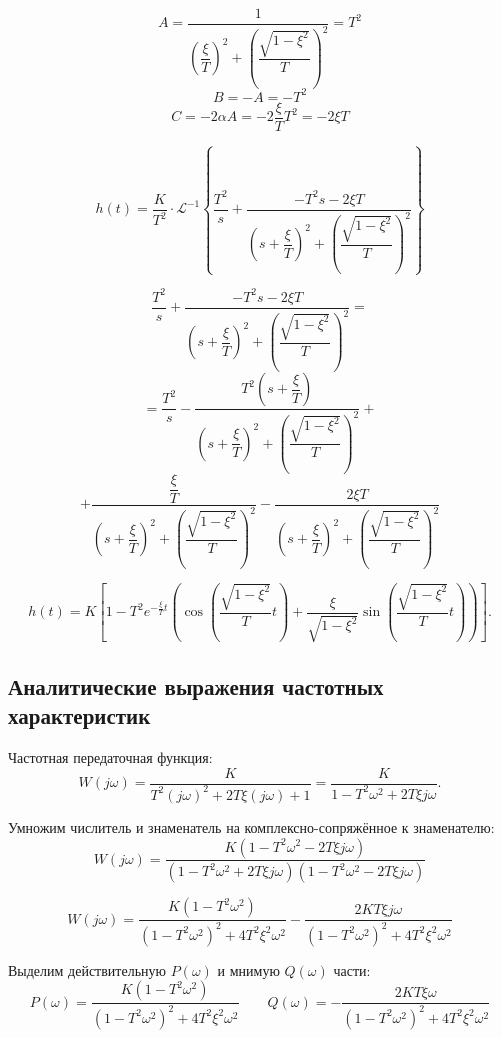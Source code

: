 \documentclass[a5paper, 10pt]{article}
\theoremstyle{definition}
\theoremstyle{plain}
\theoremstyle{remark}
\begin{document}
\[
A = \frac{1}{\left(\dfrac{\xi}{T}\right)^2 + \left(\dfrac{\sqrt{1-\xi^2}}{T}\right)^2}  = T^2
\]
\[
B = -A = -T^2
\]
\[
C = -2\alpha A = -2\dfrac{\xi}{T} T^2 = -2\xi T
\]

\[
h(t)= \frac{K}{T^2} \cdot\mathcal{L}^{-1}\!\left\{ \dfrac{T^2}{s}+\frac{-T^2s-2\xi T}{\left(s + \dfrac{ \xi }{T}\right)^2 + \left(\dfrac{\sqrt{1-\xi^2}}{T}\right)^2}\right\}
\]

$$\dfrac{T^2}{s}+\frac{-T^2s-2\xi T}{\left(s + \dfrac{ \xi }{T}\right)^2 + \left(\dfrac{\sqrt{1-\xi^2}}{T}\right)^2}=$$
 $$=\dfrac{T^2}{s}-\frac{T^2\left(s+\dfrac{\xi}{T}\right)}{\left(s + \dfrac{ \xi }{T}\right)^2 + \left(\dfrac{\sqrt{1-\xi^2}}{T}\right)^2}+$$
 $$+\frac{\dfrac{\xi}{T}}{\left(s + \dfrac{ \xi }{T}\right)^2 + \left(\dfrac{\sqrt{1-\xi^2}}{T}\right)^2}-\frac{2\xi T}{\left(s + \dfrac{ \xi }{T}\right)^2 + \left(\dfrac{\sqrt{1-\xi^2}}{T}\right)^2}$$


\[
h(t) = K \left[ 1 
- T^2 e^{-\frac{\xi}{T}t} \left( 
\cos\!\left( \frac{\sqrt{1-\xi^2}}{T} t \right)
+ \frac{\xi}{\sqrt{1-\xi^2}} 
\sin\!\left( \frac{\sqrt{1-\xi^2}}{T} t \right)
\right) \right].
\]















\subsection{Аналитические выражения частотных характеристик}


Частотная передаточная функция:
\[
W(j\omega) = \frac{K}{T^2(j\omega)^2 + 2T\xi(j\omega) + 1} 
           = \frac{K}{1 - T^2\omega^2 + 2T\xi j\omega}.
\]

Умножим числитель и знаменатель на комплексно-сопряжённое к знаменателю:
\[
W(j\omega) = \frac{K(1 - T^2\omega^2 - 2T\xi j\omega)}{(1 - T^2\omega^2 + 2T\xi j\omega)(1 - T^2\omega^2 - 2T\xi j\omega)} \]
                  
\[W(j\omega) = \frac{K(1 - T^2\omega^2)}{(1 - T^2\omega^2)^2 + 4T^2\xi^2\omega^2}-\frac{2KT\xi j\omega}{(1 - T^2\omega^2)^2 + 4T^2\xi^2\omega^2}\]


Выделим действительную $P(\omega)$ и мнимую $Q(\omega)$ части:
\[
P(\omega) = \frac{K(1 - T^2\omega^2)}{(1 - T^2\omega^2)^2 + 4T^2\xi^2\omega^2}
\qquad
Q(\omega) = -\frac{2KT\xi \omega}{(1 - T^2\omega^2)^2 + 4T^2\xi^2\omega^2}
\]
\end{document}
